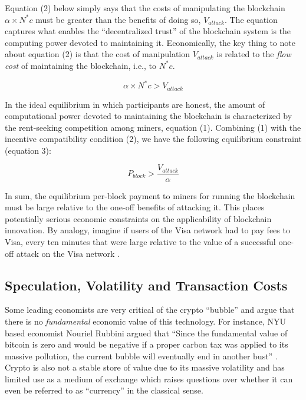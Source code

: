 \documentclass[12pt]{article}
\newcommand{\1}{\mathbbm 1}
\begin{document}
Equation (2) below simply says that the costs of manipulating the blockchain $\alpha \times N^{*} c$ must be greater than the benefits of doing so, $V_{attack}$. The equation captures what enables the ``decentralized trust'' of the blockchain system is the computing power devoted to maintaining it. Economically, the key thing to note about equation (2) is that the cost of manipulation $V_{attack}$ is related to the \textit{flow cost} of maintaining the blockchain, i.e., to $N^{*} c$.


\begin{equation}
	\alpha \times N^{*}c > V_{attack}
\end{equation}


In the ideal equilibrium in which participants are honest, the amount of computational power devoted to maintaining the blockchain is characterized by the rent-seeking competition among miners, equation (1). Combining (1) with the incentive compatibility condition (2), we have the following equilibrium constraint (equation 3):


\begin{equation}
	P_{block} > \frac{V_{attack}}{\alpha}
\end{equation}


In sum, the equilibrium per-block payment to miners for running the blockchain must be
large relative to the one-off benefits of attacking it. This places potentially serious economic constraints on the applicability of blockchain innovation. By
analogy, imagine if users of the Visa network had to pay fees to Visa, every ten minutes that were large relative to the value of a successful one-off attack on the Visa network \cite{budish2018economic}.
	

\subsection{Speculation, Volatility and Transaction Costs}
		
	Some leading economists are very critical of the crypto ``bubble'' and argue that there is no \textit{fundamental} economic value of this technology. For instance, NYU based economist Nouriel Rubbini argued that ``Since the fundamental value of bitcoin is zero and would be negative if a proper carbon tax was applied to its massive pollution, the current bubble will eventually end in another bust'' \cite{roubini2018blockchain}. Crypto is also not a stable store of value due to its massive volatility and has limited use as a medium of exchange which raises questions over whether it can even be referred to as ``currency'' in the classical sense.
	
\end{document}
